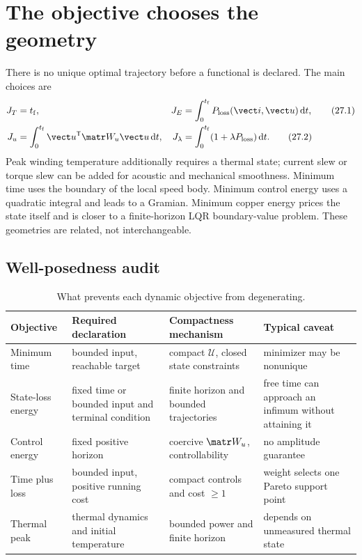 \section{The objective chooses the geometry}
\label{sec:costs-zermelo}

There is no unique optimal trajectory before a functional is declared.  The
main choices are
\begin{align}
 J_T&=t_{\mathrm f},
 &J_E&=\int_0^{t_{\mathrm f}}P_{\mathrm{loss}}(\vect i,\vect u)\,\mathrm dt,
 \tag{27.1}\\
 J_u&=\int_0^{t_{\mathrm f}}\vect u^{\mathsf T}\matr W_u\vect u\,\mathrm dt,
 &J_\lambda&=\int_0^{t_{\mathrm f}}(1+\lambda P_{\mathrm{loss}})\,\mathrm dt.
 \tag{27.2}
\end{align}
Peak winding temperature additionally requires a thermal state; current slew
or torque slew can be added for acoustic and mechanical smoothness.  Minimum
time uses the boundary of the local speed body.  Minimum control energy uses a
quadratic integral and leads to a Gramian.  Minimum copper energy prices the
state itself and is closer to a finite-horizon LQR boundary-value problem.
These geometries are related, not interchangeable.

\subsection{Well-posedness audit}

\begin{table}[tb]
\centering
\caption{What prevents each dynamic objective from degenerating.}
\label{tab:dynamic-wellposed}
\begin{tabularx}{\linewidth}{@{}lXXX@{}}
\toprule
Objective & Required declaration & Compactness mechanism & Typical caveat\\
\midrule
Minimum time & bounded input, reachable target & compact \(\mathcal U\), closed state constraints & minimizer may be nonunique\\
State-loss energy & fixed time or bounded input and terminal condition & finite horizon and bounded trajectories & free time can approach an infimum without attaining it\\
Control energy & fixed positive horizon & coercive \(\matr W_u\), controllability & no amplitude guarantee\\
Time plus loss & bounded input, positive running cost & compact controls and cost \(\geq1\) & weight selects one Pareto support point\\
Thermal peak & thermal dynamics and initial temperature & bounded power and finite horizon & depends on unmeasured thermal state\\
\bottomrule
\end{tabularx}
\end{table}

